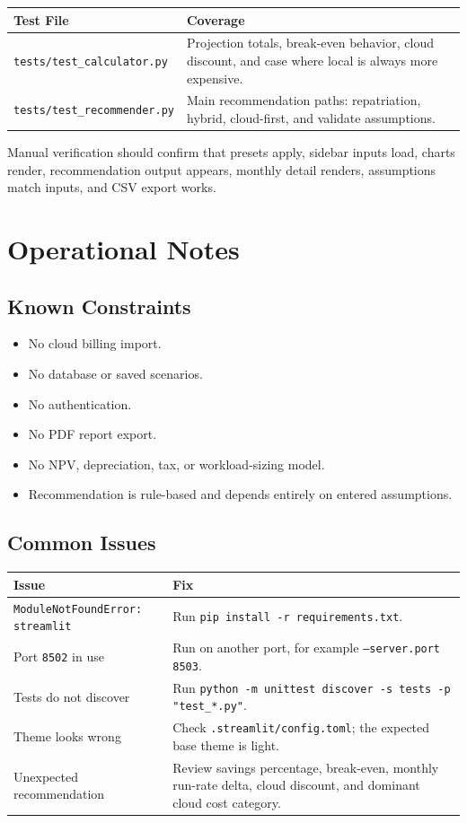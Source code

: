 \documentclass[11pt,a4paper]{article}
\begin{document}
\begin{longtable}{p{}p{}}
\toprule
\textbf{Test File} & \textbf{Coverage} \\
\midrule
\texttt{tests/test\_calculator.py} & Projection totals, break-even behavior, cloud discount, and case where local is always more expensive. \\
\texttt{tests/test\_recommender.py} & Main recommendation paths: repatriation, hybrid, cloud-first, and validate assumptions. \\
\bottomrule
\end{longtable}

Manual verification should confirm that presets apply, sidebar inputs load, charts render, recommendation output appears, monthly detail renders, assumptions match inputs, and CSV export works.

\section{Operational Notes}

\subsection{Known Constraints}

\begin{itemize}
  \item No cloud billing import.
  \item No database or saved scenarios.
  \item No authentication.
  \item No PDF report export.
  \item No NPV, depreciation, tax, or workload-sizing model.
  \item Recommendation is rule-based and depends entirely on entered assumptions.
\end{itemize}

\subsection{Common Issues}

\begin{longtable}{p{}p{}}
\toprule
\textbf{Issue} & \textbf{Fix} \\
\midrule
\texttt{ModuleNotFoundError: streamlit} & Run \texttt{pip install -r requirements.txt}. \\
Port \texttt{8502} in use & Run on another port, for example \texttt{--server.port 8503}. \\
Tests do not discover & Run \texttt{python -m unittest discover -s tests -p "test\_*.py"}. \\
Theme looks wrong & Check \texttt{.streamlit/config.toml}; the expected base theme is light. \\
Unexpected recommendation & Review savings percentage, break-even, monthly run-rate delta, cloud discount, and dominant cloud cost category. \\
\bottomrule
\end{longtable}
\end{document}
